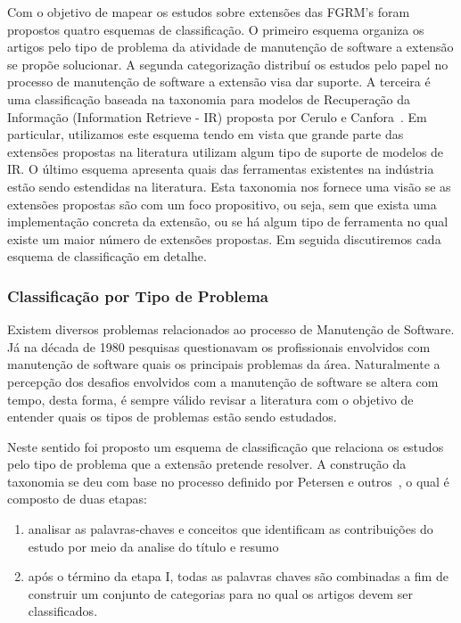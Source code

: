 Com o objetivo de mapear os estudos sobre extensões das FGRM's foram propostos quatro esquemas de classificação. O primeiro esquema organiza os artigos pelo tipo de problema da atividade de manutenção de software a extensão se propõe solucionar. A segunda categorização distribuí os estudos pelo papel no processo de manutenção de software a extensão visa dar suporte. A terceira é uma classificação baseada na taxonomia para modelos de Recuperação da Informação (Information Retrieve - IR) proposta por Cerulo e Canfora~\cite{cerulo2004taxonomy}. Em particular, utilizamos este esquema tendo em vista que grande parte das extensões propostas na literatura utilizam algum tipo de suporte de modelos de IR\@. O último esquema apresenta quais das ferramentas existentes na indústria estão sendo estendidas na literatura. Esta taxonomia nos fornece uma visão se as extensões propostas são com um foco propositivo, ou seja, sem que exista uma implementação concreta da extensão, ou se há algum tipo de ferramenta no qual existe um maior número de extensões propostas. Em seguida discutiremos cada esquema de classificação em detalhe.

\subsubsection{Classificação por Tipo de Problema}
\label{subsubsec:map-esquema-suporte-problema}

Existem diversos problemas relacionados ao processo de Manutenção de Software. Já na década de
1980 pesquisas questionavam os profissionais envolvidos com manutenção de software quais os principais
problemas da área\cite{Lientz:1981:PAS:358790.358796}. Naturalmente a percepção dos desafios
envolvidos com a manutenção de software se altera com tempo, desta forma, é sempre válido
revisar a literatura com o objetivo de entender quais os tipos de problemas estão sendo estudados.

Neste sentido foi proposto um esquema de classificação que relaciona os estudos pelo tipo de
problema que a extensão pretende resolver. A construção da taxonomia se deu com base no processo
definido por Petersen e outros~\cite{Petersen2008}, o qual é composto de duas etapas:

\begin{enumerate}[I] 
	\item analisar as palavras-chaves e conceitos que identificam as contribuições do estudo por meio da analise do título e resumo
	\item após o término da etapa I, todas as palavras chaves são combinadas a fim de construir um conjunto de categorias para no qual os artigos devem ser classificados.
\end{enumerate} 

